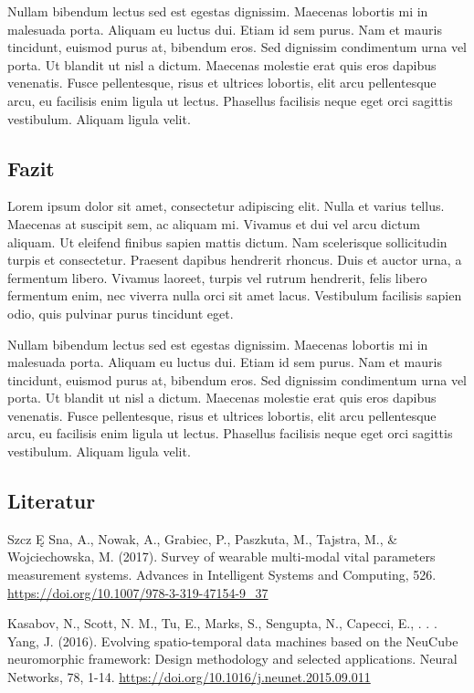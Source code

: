 \documentclass[
]{article}
\begin{document}
Nullam bibendum lectus sed est egestas dignissim. Maecenas lobortis mi
in malesuada porta. Aliquam eu luctus dui. Etiam id sem purus. Nam et
mauris tincidunt, euismod purus at, bibendum eros. Sed dignissim
condimentum urna vel porta. Ut blandit ut nisl a dictum. Maecenas
molestie erat quis eros dapibus venenatis. Fusce pellentesque, risus et
ultrices lobortis, elit arcu pellentesque arcu, eu facilisis enim ligula
ut lectus. Phasellus facilisis neque eget orci sagittis vestibulum.
Aliquam ligula velit.

\hypertarget{fazit}{%
\subsection{Fazit}\label{fazit}}

Lorem ipsum dolor sit amet, consectetur adipiscing elit. Nulla et varius
tellus. Maecenas at suscipit sem, ac aliquam mi. Vivamus et dui vel arcu
dictum aliquam. Ut eleifend finibus sapien mattis dictum. Nam
scelerisque sollicitudin turpis et consectetur. Praesent dapibus
hendrerit rhoncus. Duis et auctor urna, a fermentum libero. Vivamus
laoreet, turpis vel rutrum hendrerit, felis libero fermentum enim, nec
viverra nulla orci sit amet lacus. Vestibulum facilisis sapien odio,
quis pulvinar purus tincidunt eget.

Nullam bibendum lectus sed est egestas dignissim. Maecenas lobortis mi
in malesuada porta. Aliquam eu luctus dui. Etiam id sem purus. Nam et
mauris tincidunt, euismod purus at, bibendum eros. Sed dignissim
condimentum urna vel porta. Ut blandit ut nisl a dictum. Maecenas
molestie erat quis eros dapibus venenatis. Fusce pellentesque, risus et
ultrices lobortis, elit arcu pellentesque arcu, eu facilisis enim ligula
ut lectus. Phasellus facilisis neque eget orci sagittis vestibulum.
Aliquam ligula velit.

\hypertarget{literatur}{%
\subsection{Literatur}\label{literatur}}

Szcz Ę Sna, A., Nowak, A., Grabiec, P., Paszkuta, M., Tajstra, M., \&
Wojciechowska, M. (2017). Survey of wearable multi-modal vital
parameters measurement systems. Advances in Intelligent Systems and
Computing, 526. \url{https://doi.org/10.1007/978-3-319-47154-9_37}

Kasabov, N., Scott, N. M., Tu, E., Marks, S., Sengupta, N., Capecci, E.,
. . . Yang, J. (2016). Evolving spatio-temporal data machines based on
the NeuCube neuromorphic framework: Design methodology and selected
applications. Neural Networks, 78, 1-14.
\url{https://doi.org/10.1016/j.neunet.2015.09.011}
\end{document}
